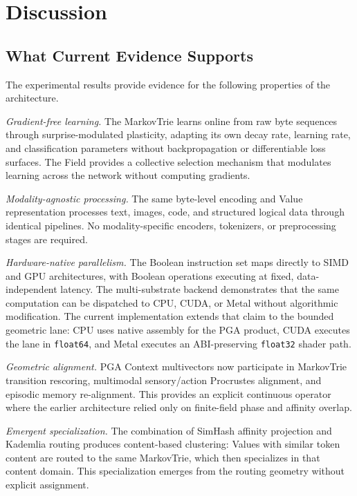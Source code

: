 \section{Discussion}

\subsection{What Current Evidence Supports}
\label{sec:evidence_supports}

The experimental results provide evidence for the following properties
of the architecture.

\emph{Gradient-free learning.}  The MarkovTrie learns online from raw
byte sequences through surprise-modulated plasticity, adapting its own
decay rate, learning rate, and classification parameters without
backpropagation or differentiable loss surfaces.  The Field provides a
collective selection mechanism that modulates learning across the
network without computing gradients.

\emph{Modality-agnostic processing.}  The same byte-level encoding and
Value representation processes text, images, code, and structured
logical data through identical pipelines.  No modality-specific
encoders, tokenizers, or preprocessing stages are required.

\emph{Hardware-native parallelism.}  The Boolean instruction set maps
directly to SIMD and GPU architectures, with Boolean operations executing
at fixed, data-independent latency.  The multi-substrate backend
demonstrates that the same computation can be dispatched to CPU, CUDA,
or Metal without algorithmic modification.  The current implementation
extends that claim to the bounded geometric lane: CPU uses native
assembly for the PGA product, CUDA executes the lane in \texttt{float64},
and Metal executes an ABI-preserving \texttt{float32} shader path.

\emph{Geometric alignment.}  PGA Context multivectors now participate in
MarkovTrie transition rescoring, multimodal sensory/action Procrustes
alignment, and episodic memory re-alignment.  This provides an explicit
continuous operator where the earlier architecture relied only on
finite-field phase and affinity overlap.

\emph{Emergent specialization.}  The combination of SimHash affinity
projection and Kademlia routing produces content-based clustering:
Values with similar token content are routed to the same MarkovTrie,
which then specializes in that content domain.  This specialization
emerges from the routing geometry without explicit assignment.

